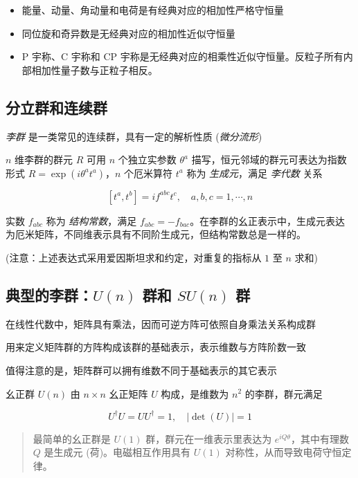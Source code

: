 \documentclass[oneside,a4paper,openany,11pt]{ctexbook}
\begin{document}
\begin{itemize}
    \item 能量、动量、角动量和电荷是有经典对应的相加性严格守恒量
    \item 同位旋和奇异数是无经典对应的相加性近似守恒量
    \item P 宇称、C 宇称和 CP 宇称是无经典对应的相乘性近似守恒量。反粒子所有内部相加性量子数与正粒子相反。
\end{itemize}

\subsection{分立群和连续群}

\emph{李群} 是一类常见的连续群，具有一定的解析性质 (\emph{微分流形})

$n$ 维李群的群元 $R$ 可用 $n$ 个独立实参数 $\theta^a$ 描写，恒元邻域的群元可表达为指数形式 $R=\exp(i\theta^a t^a)$，$n$ 个厄米算符 $t^a$ 称为 \emph{生成元}，满足 \emph{李代数} 关系

\begin{equation}
    \left[t^a, t^b\right] = i f^{abc} t^c, \quad a,b,c = 1, \cdots, n
\end{equation}

实数 $f_{abc}$ 称为 \emph{结构常数}，满足 $f_{abc}=-f_{bac}$。在李群的幺正表示中，生成元表达为厄米矩阵，不同维表示具有不同阶生成元，但结构常数总是一样的。

(注意：上述表达式采用爱因斯坦求和约定，对重复的指标从 $1$ 至 $n$ 求和)

\subsection{典型的李群：\texorpdfstring{$U(n)$}{U(n)} 群和 \texorpdfstring{$SU(n)$}{SU(n)} 群}

在线性代数中，矩阵具有乘法，因而可逆方阵可依照自身乘法关系构成群

用来定义矩阵群的方阵构成该群的基础表示，表示维数与方阵阶数一致

值得注意的是，矩阵群可以拥有维数不同于基础表示的其它表示

幺正群 $U(n)$ 由 $n\times n$ 幺正矩阵 $U$ 构成，是维数为 $n^2$ 的李群，群元满足

\begin{equation}
    U^\dagger U = U U^\dagger = 1, \quad |\det(U)|=1
\end{equation}

\begin{quote}
    最简单的幺正群是 $U(1)$ 群，群元在一维表示里表达为 $e^{iQ\theta}$，其中有理数 $Q$ 是生成元 (荷)。电磁相互作用具有 $U(1)$ 对称性，从而导致电荷守恒定律。
\end{quote}
\end{document}
